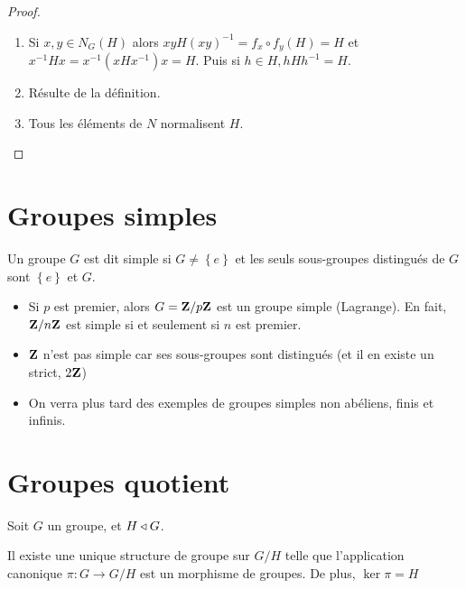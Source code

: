 \begin{proof} ~
\begin{enumerate}
    \item Si $x, y \in  N_G(H)$ alors $xyH(xy)^{-1}=f_x\circ f_y(H)=H$ et $x^{-1} H x=x^{-1} (xHx^{-1} )x=H$. Puis si $h \in  H, hHh^{-1}=H$.
    \item Résulte de la définition.
    \item Tous les éléments de $N$ normalisent  $H$.
\end{enumerate}
\end{proof}

\section{Groupes simples}
\begin{dfn}
    Un groupe $G$ est dit simple si  $G\neq \left\{ e \right\} $ et les seuls sous-groupes distingués de $G$ sont  $\left\{ e \right\} $ et $G$.
\end{dfn}

\begin{ex}
\begin{itemize}
    \item Si $p$ est premier, alors  $G = \mathbf Z / p\mathbf Z$ est un groupe simple (Lagrange). En fait, $\mathbf Z / n\mathbf Z$ est simple si et seulement si $n$ est premier.
    \item  $\mathbf Z$ n'est pas simple car ses sous-groupes sont distingués (et il en existe un strict, $2\mathbf Z$)
    \item On verra plus tard des exemples de groupes simples non abéliens, finis et infinis.
\end{itemize}
\end{ex}

\section{Groupes quotient}

Soit $G$ un groupe, et  $H\triangleleft G$.

 \begin{thmdef}
Il existe une unique structure de groupe sur $G / H$ telle que l'application canonique  $\pi : G \longrightarrow G / H$ est un morphisme de groupes. De plus, $\ker \pi=H$
\end{thmdef}

